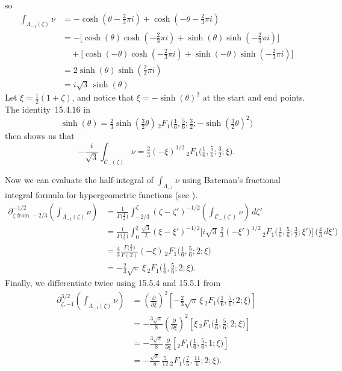 \documentclass{article}
\theoremstyle{definition}
\newcommand{\fracderiv}[3]{\partial^{#1}_{#2, #3}}
\begin{document}
so
\begin{align*}
\int_{\Lambda_{-1}(\zeta)} \nu & =- \cosh(\theta - \tfrac{2}{3}\pi i) + \cosh(-\theta - \tfrac{2}{3}\pi i) \\
& =- \big[\cosh(\theta) \cosh(-\tfrac{2}{3}\pi i) + \sinh(\theta) \sinh(-\tfrac{2}{3}\pi i)\big] \\
& \quad + \big[\cosh(-\theta) \cosh(-\tfrac{2}{3}\pi i) + \sinh(-\theta) \sinh(-\tfrac{2}{3}\pi i)\big] \\
& = 2\sinh(\theta) \sinh(\tfrac{2}{3}\pi i) \\
& = i\sqrt{3}\,\sinh(\theta)
\end{align*}
Let $\xi = \tfrac{1}{2}(1 + \zeta)$, and notice that $\xi =- \sinh( \theta)^2$ at the start and end points. The identity~15.4.16 in \cite{dlmf}
\[ \sinh(\theta) = \tfrac{2}{3} \sinh(\tfrac{3}{2} \theta)\, {}_2F_1\big(\tfrac{1}{6}, \tfrac{5}{6}; \tfrac{3}{2}; -\sinh(\tfrac{3}{2} \theta)^2\big) \]
then shows us that
\[ -\frac{i}{\sqrt{3}} \int_{\mathcal{C}_-(\zeta)} \nu = \tfrac{2}{3} (-\xi)^{1/2}\, {}_2F_1\big(\tfrac{1}{6}, \tfrac{5}{6}; \tfrac{3}{2}; \xi\big). \]

Now we can evaluate the half-integral of $\int_{\Lambda_{-1}} \nu$ using Bateman's fractional integral formula for hypergeometric functions (see \cite[Section 4.1 ]{koornwinder2015fractional}).
\begin{align*}
\partial^{-1/2}_{\zeta \text{ from } -2/3} \left( \int_{\Lambda_{-1}(\zeta)} \nu \right) & = \frac{1}{\Gamma\big(\tfrac{1}{2}\big)} \int_{-2/3}^\zeta (\zeta - \zeta')^{-1/2} \left( \int_{\mathcal{C}_-(\zeta')} \nu \right)\,d\zeta' \\
& = \frac{1}{\Gamma\big(\tfrac{1}{2}\big)} \int_0^\xi \tfrac{\sqrt{3}}{2} (\xi - \xi')^{-1/2} \Big[{i}{\sqrt{3}}\,\tfrac{2}{3} (-\xi')^{1/2}\, {}_2F_1\big(\tfrac{1}{6}, \tfrac{5}{6}; \tfrac{3}{2}; \xi' \big) \Big] \,\big( \tfrac{4}{3}\,d\xi' \big) \\
& =  \frac{4}{3} \frac{\Gamma\big(\tfrac{3}{2}\big)}{\Gamma(2)} (-\xi)\, {}_2F_1\big(\tfrac{1}{6}, \tfrac{5}{6}; 2; \xi\big) \\
& = - \frac{2}{3} \sqrt{\pi}\,\xi\,{}_2F_1\big(\tfrac{1}{6}, \tfrac{5}{6}; 2; \xi\big).
\end{align*}
Finally, we differentiate twice using 15.5.4 and 15.5.1 from \cite{dlmf}
\begin{align*}
\fracderiv{3/2}{\zeta}{-1} \left( \int_{\Lambda_{-1}(\zeta)} \nu \right) & = \left(\tfrac{\partial}{\partial \xi}\right)^2 \left[ - \frac{2}{3} \sqrt{\pi}\,\xi\, {}_2F_1\big(\tfrac{1}{6}, \tfrac{5}{6}; 2; \xi\big) \right] \\
& = - \tfrac{3\sqrt{\pi}}{8} \left(\tfrac{\partial}{\partial \xi}\right)^2 \left[ \xi\, {}_2F_1\big(\tfrac{1}{6}, \tfrac{5}{6}; 2; \xi\big) \right] \\
& = - \tfrac{3\sqrt{\pi}}{8}\,\tfrac{\partial}{\partial \xi} \left[ {}_2F_1\big(\tfrac{1}{6}, \tfrac{5}{6}; 1; \xi\big) \right] \\
& = - \tfrac{\sqrt{\pi}}{8}\,\tfrac{5}{12}\, {}_2F_1\big(\tfrac{7}{6}, \tfrac{11}{6}; 2; \xi\big).
\end{align*}
\end{document}
